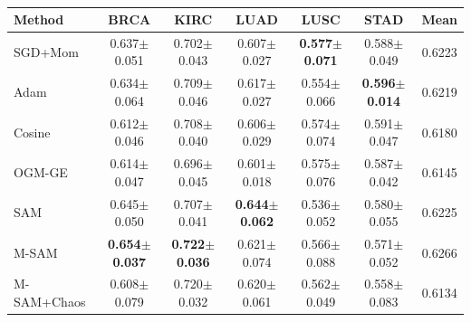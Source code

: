 \begin{table}[t]
\centering
\caption{}
\begin{tabular}{lcccccc}
\toprule
Method & BRCA & KIRC & LUAD & LUSC & STAD & Mean \\
\midrule
SGD+Mom & 0.637$\pm$0.051 & 0.702$\pm$0.043 & 0.607$\pm$0.027 & \textbf{0.577$\pm$0.071} & 0.588$\pm$0.049 & 0.6223 \\
Adam & 0.634$\pm$0.064 & 0.709$\pm$0.046 & 0.617$\pm$0.027 & 0.554$\pm$0.066 & \textbf{0.596$\pm$0.014} & 0.6219 \\
Cosine & 0.612$\pm$0.046 & 0.708$\pm$0.040 & 0.606$\pm$0.029 & 0.574$\pm$0.074 & 0.591$\pm$0.047 & 0.6180 \\
OGM-GE & 0.614$\pm$0.047 & 0.696$\pm$0.045 & 0.601$\pm$0.018 & 0.575$\pm$0.076 & 0.587$\pm$0.042 & 0.6145 \\
SAM & 0.645$\pm$0.050 & 0.707$\pm$0.041 & \textbf{0.644$\pm$0.062} & 0.536$\pm$0.052 & 0.580$\pm$0.055 & 0.6225 \\
M-SAM & \textbf{0.654$\pm$0.037} & \textbf{0.722$\pm$0.036} & 0.621$\pm$0.074 & 0.566$\pm$0.088 & 0.571$\pm$0.052 & 0.6266 \\
M-SAM+Chaos & 0.608$\pm$0.079 & 0.720$\pm$0.032 & 0.620$\pm$0.061 & 0.562$\pm$0.049 & 0.558$\pm$0.083 & 0.6134 \\
\bottomrule
\end{tabular}
\end{table}
